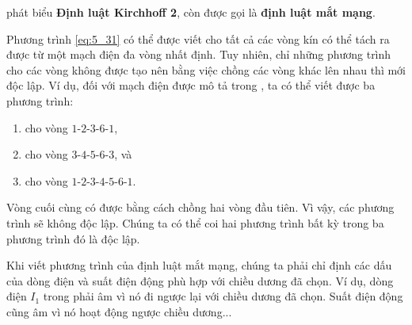 \noindent
phát biểu \textbf{Định luật Kirchhoff 2}, còn được gọi là \textbf{định luật mắt mạng}.


Phương trình \eqref{eq:5_31} có thể được viết cho tất cả các vòng kín có thể tách ra được từ một mạch điện đa vòng nhất định. Tuy nhiên, chỉ những phương trình cho các vòng không được tạo nên bằng việc chồng các vòng khác lên nhau thì mới độc lập. Ví dụ, đối với mạch điện được mô tả trong , ta có thể viết được ba phương trình:
\begin{enumerate}[(1)]
    \item cho vòng $1$-$2$-$3$-$6$-$1$,
    \item cho vòng $3$-$4$-$5$-$6$-$3$, và
    \item cho vòng $1$-$2$-$3$-$4$-$5$-$6$-$1$.
\end{enumerate}

Vòng cuối cùng có được bằng cách chồng hai vòng đầu tiên. Vì vậy, các phương trình sẽ không độc lập. Chúng ta có thể coi hai phương trình bất kỳ trong ba phương trình đó là độc lập.

Khi viết phương trình của định luật mắt mạng, chúng ta phải chỉ định các dấu của dòng điện và suất điện động phù hợp với chiều dương đã chọn. Ví dụ, dòng điện $I_1$ trong  phải âm vì nó đi ngược lại với chiều dương đã chọn. Suất điện động cũng âm vì nó hoạt động ngược chiều dương...


